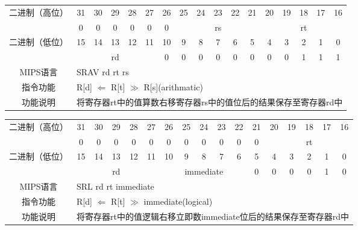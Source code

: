 \begin{table}
\begin{tabular}{|c|c|c|c|c|c|c|c|c|c|c|c|c|c|c|c|c|}
\hline
\multirow{2}{*}{二进制（高位）} &
31&30&29&28&27&26&25&24&23&22&21&20&19&18&17&16\\
\cline{2-17}
&
0&0&0&0&0&
0&
\multicolumn{5}{c|}{rs}&
\multicolumn{5}{c|}{rt}\\
\hline
\multirow{2}{*}{二进制（低位）} &
15&14&13&12&11&10&9&8&7&6&5&4&3&2&1&0\\
\cline{2-17}
&
\multicolumn{5}{c|}{rd} &
0&0&0&0&0&
0&0&0&1&1&
1\\
\hline
MIPS语言&
\multicolumn{16}{l|}{SRAV rd rt rs}\\
\hline
指令功能&
\multicolumn{16}{l|}{R[d] $\Leftarrow$ R[t] $\gg$ R[s](arithmatic)}\\
\hline
功能说明&
\multicolumn{16}{l|}{将寄存器rt中的值算数右移寄存器rs中的值位后的结果保存至寄存器rd中}\\
\hline
\end{tabular}
\end{table}

\begin{table}
\begin{tabular}{|c|c|c|c|c|c|c|c|c|c|c|c|c|c|c|c|c|}
\hline
\multirow{2}{*}{二进制（高位）} &
31&30&29&28&27&26&25&24&23&22&21&20&19&18&17&16\\
\cline{2-17}
&
0&0&0&0&0&
0&0&0&0&0&
0&
\multicolumn{5}{c|}{rt}\\
\hline
\multirow{2}{*}{二进制（低位）} &
15&14&13&12&11&10&9&8&7&6&5&4&3&2&1&0\\
\cline{2-17}
&
\multicolumn{5}{c|}{rd} &
\multicolumn{5}{c|}{immediate} &
0&0&0&0&1&
0\\
\hline
MIPS语言&
\multicolumn{16}{l|}{SRL rd rt immediate}\\
\hline
指令功能&
\multicolumn{16}{l|}{R[d] $\Leftarrow$ R[t] $\gg$ immediate(logical)}\\
\hline
功能说明&
\multicolumn{16}{l|}{将寄存器rt中的值逻辑右移立即数immediate位后的结果保存至寄存器rd中}\\
\hline
\end{tabular}
\end{table}

